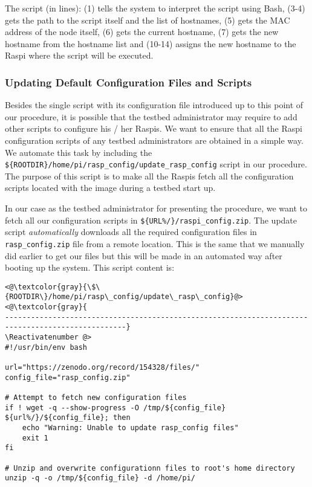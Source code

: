 The script (in lines): (1) tells the system to interpret the script
using \ac{Bash}, (3-4) gets the path to the script itself and the list of
hostnames, (5) gets the \ac{MAC} address of the node itself, (6) gets the
current hostname, (7) gets the new hostname from the hostname list and
(10-14) assigns the new hostname to the \ac{Raspi} where the script
will be executed.

\subsubsection{Updating Default Configuration Files and Scripts}
Besides the single script with its configuration file introduced up
to this point of our procedure, it is possible that the testbed
administrator may require to add other scripts to configure
his / her \ac{Raspi}s. We want
to ensure that all the \ac{Raspi} configuration scripts of any testbed
administrators are obtained in a simple way. We automate this task by
including the \texttt{\$\{ROOTDIR\}/home/pi/rasp\_config/update\_rasp\_config}
script in our procedure. The purpose of this script is to make all the
\ac{Raspi}s fetch all the configuration scripts located with the image
during a testbed start up.

In our case as the testbed administrator for presenting the procedure, we want
to fetch all our configuration scripts in
\texttt{\$\{URL\%/\}/raspi\_config.zip}. The update script
\textit{automatically} downloads all the required configuration files in
\texttt{rasp\_config.zip} file from a remote location. This is the same that
we manually did earlier to get our files but this will be made in an
automated way after booting up the system. This script content is:

\Suppressnumber\begin{lstlisting}[]
<@\textcolor{gray}{\$\{ROOTDIR\}/home/pi/rasp\_config/update\_rasp\_config}@>
<@\textcolor{gray}{
--------------------------------------------------------------------------------------------------}
\Reactivatenumber @>
#!/usr/bin/env bash

url="https://zenodo.org/record/154328/files/"
config_file="rasp_config.zip"

# Attempt to fetch new configuration files
if ! wget -q --show-progress -O /tmp/${config_file} ${url%/}/${config_file}; then
    echo "Warning: Unable to update rasp_config files"
    exit 1
fi

# Unzip and overwrite configurationn files to root's home directory
unzip -q -o /tmp/${config_file} -d /home/pi/
\end{lstlisting}
\FloatBarrier
\vspace{-5mm}

